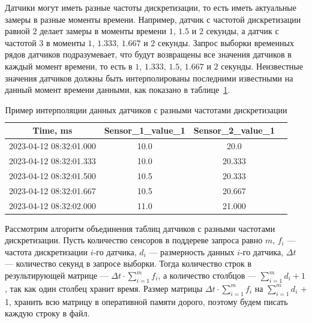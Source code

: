 Датчики могут иметь разные частоты дискретизации, то есть иметь актуальные замеры в разные моменты времени. Например, датчик с частотой дискретизации равной $2$ делает замеры в моменты времени $1$, $1.5$ и $2$ секунды, а датчик с частотой $3$ в моменты $1$, $1.333$, $1.667$ и $2$ секунды. Запрос выборки временных рядов датчиков подразумевает, что будут возвращены все значения датчиков в каждый момент времени, то есть в $1$, $1.333$, $1.5$, $1.667$ и $2$ секунды. Неизвестные значения датчиков должны быть интерполированы последними известными на данный момент времени данными, как показано в таблице~\ref{sample2}.

\begin{table}
  \caption{Пример интерполяции данных датчиков с разными частотами дискретизации}
  \fontsize{12pt}{18pt}\selectfont
  \begin{tabular}{|c|c|c|c|}\hline
    \textbf{Time, ms}       & \textbf{Sensor\_1\_value\_1} & \textbf{Sensor\_2\_value\_1} \\ \hline
    2023-04-12 08:32:01.000 & 10.0                         & 20.0                         \\ \hline
    2023-04-12 08:32:01.333 & 10.0                         & 20.333                       \\ \hline
    2023-04-12 08:32:01.500 & 10.5                         & 20.333                       \\ \hline
    2023-04-12 08:32:01.667 & 10.5                         & 20.667                       \\ \hline
    2023-04-12 08:32:02.000 & 11.0                         & 21.000                       \\ \hline
  \end{tabular}
  \label{sample2}
\end{table}




Рассмотрим алгоритм объединения таблиц датчиков с разными частотами дискретизации. Пусть количество сенсоров в поддереве запроса равно $m$, $f_i$ --- частота дискретизации $i$-го датчика, $d_i$ --- размерность данных $i$-го датчика, ${\Delta}t$ --- количество секунд в запросе выборки. Тогда количество строк в результирующей матрице --- ${\Delta}t \cdot \sum^{m}_{i=1}{f_i}$, а количество столбцов --- $\sum^{m}_{i=1}{d_i} + 1$, так как один столбец хранит время. Размер матрицы ${\Delta}t \cdot \sum^{m}_{i=1}{f_i} $ на $\sum^{m}_{i=1}{d_i}$ + 1, хранить всю матрицу в оперативной памяти дорого, поэтому будем писать каждую строку в файл.

